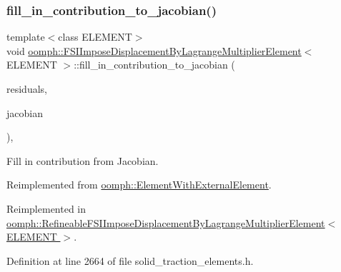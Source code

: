 \subsubsection{\texorpdfstring{fill\+\_\+in\+\_\+contribution\+\_\+to\+\_\+jacobian()}{fill\_in\_contribution\_to\_jacobian()}}
{\footnotesize\ttfamily template$<$class E\+L\+E\+M\+E\+NT$>$ \\
void \hyperlink{classoomph_1_1FSIImposeDisplacementByLagrangeMultiplierElement}{oomph\+::\+F\+S\+I\+Impose\+Displacement\+By\+Lagrange\+Multiplier\+Element}$<$ E\+L\+E\+M\+E\+NT $>$\+::fill\+\_\+in\+\_\+contribution\+\_\+to\+\_\+jacobian (\begin{DoxyParamCaption}\item[{\hyperlink{classoomph_1_1Vector}{Vector}$<$ double $>$ \&}]{residuals,  }\item[{\hyperlink{classoomph_1_1DenseMatrix}{Dense\+Matrix}$<$ double $>$ \&}]{jacobian }\end{DoxyParamCaption})\hspace{0.3cm}{\ttfamily [inline]}, {\ttfamily [virtual]}}



Fill in contribution from Jacobian. 



Reimplemented from \hyperlink{classoomph_1_1ElementWithExternalElement_ae5fb09552a8271e891438f8d058ca1b8}{oomph\+::\+Element\+With\+External\+Element}.



Reimplemented in \hyperlink{classoomph_1_1RefineableFSIImposeDisplacementByLagrangeMultiplierElement_a3c86bf6884cd7cfdfa8e7381fbd16fcf}{oomph\+::\+Refineable\+F\+S\+I\+Impose\+Displacement\+By\+Lagrange\+Multiplier\+Element$<$ E\+L\+E\+M\+E\+N\+T $>$}.



Definition at line 2664 of file solid\+\_\+traction\+\_\+elements.\+h.

\mbox{\label{classoomph_1_1FSIImposeDisplacementByLagrangeMultiplierElement_a7a8efac16a0f0db829372e0d52bf750f}} 
